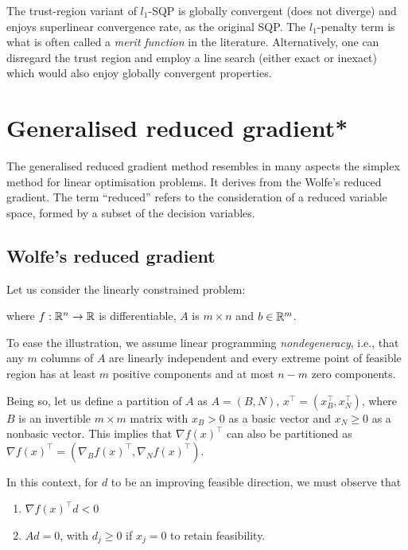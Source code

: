 The trust-region variant of $l_1$-SQP is globally convergent (does not diverge) and enjoys superlinear convergence rate, as the original SQP. The $l_1$-penalty term is what is often called a \emph{merit function} in the literature. Alternatively, one can disregard the trust region and employ a line search (either exact or inexact) which would also enjoy globally convergent properties.  


\section{Generalised reduced gradient*}


The generalised reduced gradient method resembles in many aspects the simplex method for linear optimisation problems. It derives from the Wolfe's reduced gradient. The term ``reduced'' refers to the consideration of a reduced variable space, formed by a subset of the decision variables.

\subsection{Wolfe's reduced gradient}

Let us consider the linearly constrained problem:
where $f : \mathbb{R}^n \rightarrow \mathbb{R}$ is differentiable, $A$ is $m \times n$ and $b \in \mathbb{R}^m$.

To ease the illustration, we assume linear programming \emph{nondegeneracy}, i.e., that any $m$ columns of $A$ are linearly independent and every extreme point of feasible region has at least $m$ positive components and at most $n-m$ zero components.

Being so, let us define a partition of $A$ as $A = (B, N)$, $x^\top = (x_B^\top, x_N^\top)$, where $B$ is an invertible $m \times m$ matrix with $x_B > 0$ as a basic vector and $x_N \geq 0$ as a nonbasic vector. This implies that $\nabla f(x)^\top$ can also be partitioned as $\nabla f(x)^\top= (\nabla_Bf (x)^\top, \nabla_Nf(x)^\top)$.

In this context, for $d$ to be an improving feasible direction, we must observe that
\begin{enumerate}
	\item $\nabla f(x)^\top d < 0$
	\item $Ad = 0$, with $d_j \geq 0$ if $x_j = 0$ to retain feasibility.  
\end{enumerate}


